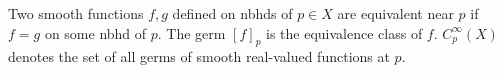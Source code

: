 Two smooth functions $f, g$ defined on nbhds of $p \in X$ are equivalent near $p$ if $f = g$ on some nbhd of $p$. The germ $[f]_p$ is the equivalence class of $f$. $C_p^\infty(X)$ denotes the set of all germs of smooth real-valued functions at $p$.
